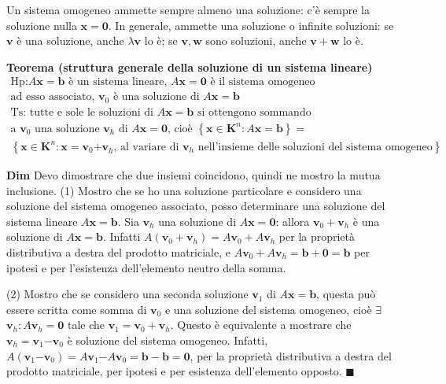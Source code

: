 \documentclass{article}
\begin{document}
Un sistema omogeneo ammette sempre almeno una soluzione: c'\`{e} sempre la
soluzione nulla $\mathbf{x=0}$. In generale, ammette una soluzione o
infinite soluzioni: se $\mathbf{v}$ \`{e} una soluzione, anche $\lambda 
\mathbf{v}$ lo \`{e}; se $\mathbf{v,w}$ sono soluzioni, anche $\mathbf{v+w}$
lo \`{e}.

\textbf{Teorema (struttura generale della soluzione di un sistema lineare)}%
\begin{gather*}
\text{Hp}\text{:}A\mathbf{x}=\mathbf{b}\text{ \`{e} un sistema lineare, }A%
\mathbf{x}=\mathbf{0}\text{ \`{e} il sistema omogeneo } \\
\text{ad esso associato, }\mathbf{v}_{0}\text{ \`{e} una soluzione di }A%
\mathbf{x}=\mathbf{b} \\
\text{Ts}\text{:}\text{ tutte e sole le soluzioni di }A\mathbf{x}=\mathbf{b}%
\text{ si ottengono sommando } \\
\text{a }\mathbf{v}_{0}\text{ una soluzione }\mathbf{v}_{h}\text{ di }A%
\mathbf{x}=\mathbf{0}\text{, cio\`{e} }\left\{ \mathbf{x}\in \mathbf{K}^{n}:A%
\mathbf{x}=\mathbf{b}\right\} = \\
\left\{ \mathbf{x}\in \mathbf{K}^{n}:\mathbf{x=v}_{0}\mathbf{+v}_{h}\text{,
al variare di }\mathbf{v}_{h}\text{ nell'insieme delle soluzioni del sistema
omogeneo}\right\} 
\end{gather*}

\textbf{Dim} Devo dimostrare che due insiemi coincidono, quindi ne mostro la
mutua inclusione. (1) Mostro che se ho una soluzione particolare e considero
una soluzione del sistema omogeneo associato, posso determinare una
soluzione del sistema lineare $A\mathbf{x}=\mathbf{b}$. Sia $\mathbf{v}_{h}$
una soluzione di $A\mathbf{x}=\mathbf{0}$: allora $\mathbf{v}_{0}+\mathbf{v}%
_{h}$ \`{e} una soluzione di $A\mathbf{x}=\mathbf{b}$. Infatti $A\left( 
\mathbf{v}_{0}+\mathbf{v}_{h}\right) =A\mathbf{v}_{0}+A\mathbf{v}_{h}$ per
la propriet\`{a} distributiva a destra del prodotto matriciale, e $A\mathbf{v%
}_{0}+A\mathbf{v}_{h}=\mathbf{b+0=b}$ per ipotesi e per l'esistenza
dell'elemento neutro della somma.

(2) Mostro che se considero una seconda soluzione $\mathbf{v}_{1}$ di $A%
\mathbf{x=b}$, questa pu\`{o} essere scritta come somma di $\mathbf{v}_{0}$
e una soluzione del sistema omogeneo, cio\`{e} $\exists $ $\mathbf{v}_{h}:A%
\mathbf{v}_{h}=\mathbf{0}$ tale che $\mathbf{v}_{1}=\mathbf{v}_{0}+\mathbf{v}%
_{h}$. Questo \`{e} equivalente a mostrare che $\mathbf{v}_{h}=\mathbf{v}_{1}%
\mathbf{-v}_{0}$ \`{e} soluzione del sistema omogeneo. Infatti, $A\left( 
\mathbf{v}_{1}\mathbf{-v}_{0}\right) =A\mathbf{v}_{1}\mathbf{-}A\mathbf{v}%
_{0}=\mathbf{b-b=0}$, per la propriet\`{a} distributiva a destra del
prodotto matriciale, per ipotesi e per esistenza dell'elemento opposto. $\blacksquare $
\end{document}
